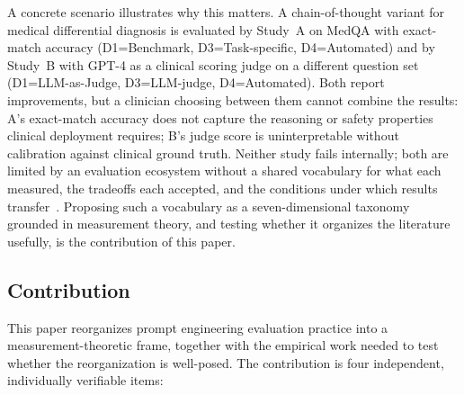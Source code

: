 \documentclass[acmsmall, nonacm, screen]{acmart}
\begin{document}
A concrete scenario illustrates why this matters. A chain-of-thought
variant for medical differential diagnosis is evaluated by Study~A on
MedQA with exact-match accuracy (D1=Benchmark, D3=Task-specific,
D4=Automated) and by Study~B with GPT-4 as a clinical scoring judge
on a different question set (D1=LLM-as-Judge, D3=LLM-judge,
D4=Automated). Both report improvements, but a clinician choosing
between them cannot combine the results: A's exact-match accuracy
does not capture the reasoning or safety properties clinical
deployment requires; B's judge score is uninterpretable without
calibration against clinical ground truth. Neither study fails
internally; both are limited by an evaluation ecosystem without a
shared vocabulary for what each measured, the tradeoffs each
accepted, and the conditions under which results
transfer~\cite{chang2023survey, guo2023evaluating}. Proposing such a
vocabulary as a seven-dimensional taxonomy grounded in measurement
theory, and testing whether it organizes the literature usefully, is
the contribution of this paper.

\subsection*{Contribution}

This paper reorganizes prompt engineering evaluation practice into a
measurement-theoretic frame, together with the empirical work needed
to test whether the reorganization is well-posed. The contribution
is four independent, individually verifiable items:
\end{document}
